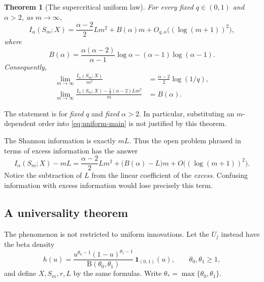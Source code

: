 \documentclass[11pt,a4paper]{article}
\numberwithin{equation}{section}
\newtheorem{theorem}{Theorem}[section]
\theoremstyle{definition}\newaliascnt{definition}{theorem}
\theoremstyle{remark}\newaliascnt{remark}{theorem}
\newcommand{\Bf}{\mathrm B}
\begin{document}
\begin{theorem}[The supercritical uniform law]
\label{thm:uniform}
For every fixed $q\in(0,1)$ and $\alpha>2$, as $m\to\infty$,
\begin{equation}
 \boxed{\displaystyle
 I_\alpha(S_m;X)=\frac{\alpha-2}{2}L m^2+B(\alpha)m
                   +O_{q,\alpha}\bigl((\log(m+1))^2\bigr),}
 \label{eq:uniform-main}
\end{equation}
where
\begin{equation}
 B(\alpha)=\frac{\alpha(\alpha-2)}{\alpha-1}\log\alpha
                -(\alpha-1)\log(\alpha-1).
 \label{eq:Balpha}
\end{equation}
Consequently,
\begin{align}
 \lim_{m\to\infty}\frac{I_\alpha(S_m;X)}{m^2}
      &=\frac{\alpha-2}{2}\log(1/q),\label{eq:quadratic-limit}\\
 \lim_{m\to\infty}\frac{I_\alpha(S_m;X)
                  -\frac12(\alpha-2)Lm^2}{m}
      &=B(\alpha).\label{eq:linear-limit}
\end{align}
\end{theorem}
The statement is for \emph{fixed} $q$ and \emph{fixed} $\alpha>2$.
In particular, substituting an $m$-dependent order into
\eqref{eq:uniform-main} is not justified by this theorem.

The Shannon information is exactly $mL$. Thus the open problem phrased in
terms of excess information has the answer
\begin{equation}
 I_\alpha(S_m;X)-mL
   =\frac{\alpha-2}{2}Lm^2+\bigl(B(\alpha)-L\bigr)m
     +O\bigl((\log(m+1))^2\bigr).
 \label{eq:excess-main}
\end{equation}
Notice the subtraction of $L$ from the linear coefficient of the
\emph{excess}. Confusing information with excess information would lose
precisely this term.

\subsection{A universality theorem}
The phenomenon is not restricted to uniform innovations. Let the $U_j$ instead
have the beta density
\begin{equation}
 h(u)=\frac{u^{\theta_0-1}(1-u)^{\theta_1-1}}
                   {\Bf(\theta_0,\theta_1)}\,\boldsymbol1_{(0,1)}(u),
 \qquad \theta_0,\theta_1\ge1,
 \label{eq:beta-innovation}
\end{equation}
and define $X,S_m,r,L$ by the same formulas. Write
$\theta_* =\max\{\theta_0,\theta_1\}$.
\end{document}

